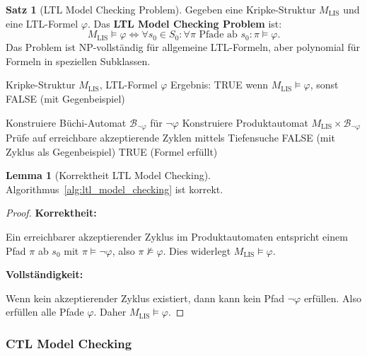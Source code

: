 \documentclass[a4paper,12pt]{article}
\theoremstyle{definition}
\newtheorem{satz}{Satz}
\newtheorem{lemma}{Lemma}
\begin{document}
	\begin{satz}[LTL Model Checking Problem]
		\label{satz:ltl_model_checking}
		Gegeben eine Kripke-Struktur $M_{\text{LIS}}$ und eine LTL-Formel $\varphi$. Das \textbf{LTL Model Checking Problem} ist:
		\[
		M_{\text{LIS}} \models \varphi \iff \forall s_0 \in S_0: \forall \pi \text{ Pfade ab } s_0: \pi \models \varphi.
		\]
		Das Problem ist NP-vollständig für allgemeine LTL-Formeln, aber polynomial für Formeln in speziellen Subklassen.
	\end{satz}
	
	\begin{algorithm}[H]
		\caption{LTL Model Checking (Automatentheorie-Ansatz)}
		\label{alg:ltl_model_checking}
		\begin{algorithmic}[1]
			\Require Kripke-Struktur $M_{\text{LIS}}$, LTL-Formel $\varphi$
			\Ensure Ergebnis: TRUE wenn $M_{\text{LIS}} \models \varphi$, sonst FALSE (mit Gegenbeispiel)
			
			\State Konstruiere Büchi-Automat $\mathcal{B}_{\neg\varphi}$ für $\neg\varphi$
			\State Konstruiere Produktautomat $M_{\text{LIS}} \times \mathcal{B}_{\neg\varphi}$
			\State Prüfe auf erreichbare akzeptierende Zyklen mittels Tiefensuche
			\State \Return FALSE (mit Zyklus als Gegenbeispiel)
			\Else
			\State \Return TRUE (Formel erfüllt)
			\EndIf
		\end{algorithmic}
	\end{algorithm}
	
	\begin{lemma}[Korrektheit LTL Model Checking]
		\label{lem:ltl_mc_korrektheit}
		Algorithmus~\ref{alg:ltl_model_checking} ist korrekt.
	\end{lemma}
	
	\begin{proof}
		\textbf{Korrektheit:}
		
		Ein erreichbarer akzeptierender Zyklus im Produktautomaten entspricht einem Pfad $\pi$ ab $s_0$ mit $\pi \models \neg\varphi$, also $\pi \not\models \varphi$. Dies widerlegt $M_{\text{LIS}} \models \varphi$.
		
		\textbf{Vollständigkeit:}
		
		Wenn kein akzeptierender Zyklus existiert, dann kann kein Pfad $\neg\varphi$ erfüllen. Also erfüllen alle Pfade $\varphi$. Daher $M_{\text{LIS}} \models \varphi$.
	\end{proof}
	
	\subsubsection{CTL Model Checking}
	
\end{document}

